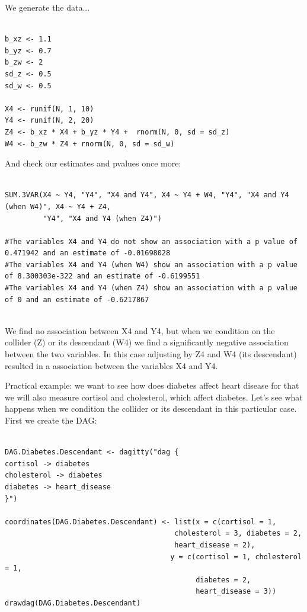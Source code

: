 \documentclass{article}
\begin{document}
We generate the data...


\begin{lstlisting}

b_xz <- 1.1
b_yz <- 0.7
b_zw <- 2
sd_z <- 0.5
sd_w <- 0.5

X4 <- runif(N, 1, 10)
Y4 <- runif(N, 2, 20)
Z4 <- b_xz * X4 + b_yz * Y4 +  rnorm(N, 0, sd = sd_z)
W4 <- b_zw * Z4 + rnorm(N, 0, sd = sd_w)

\end{lstlisting}

And check our estimates and pvalues once more:

\begin{lstlisting}

SUM.3VAR(X4 ~ Y4, "Y4", "X4 and Y4", X4 ~ Y4 + W4, "Y4", "X4 and Y4 (when W4)", X4 ~ Y4 + Z4,
         "Y4", "X4 and Y4 (when Z4)")

#The variables X4 and Y4 do not show an association with a p value of 0.471942 and an estimate of -0.01698028 
#The variables X4 and Y4 (when W4) show an association with a p value of 8.300303e-322 and an estimate of -0.6199551 
#The variables X4 and Y4 (when Z4) show an association with a p value of 0 and an estimate of -0.6217867 


\end{lstlisting}

We find no association between X4 and Y4, but when we condition on the collider (Z) or its descendant (W4) we find a significantly negative association between the two variables. 
In this case adjusting by Z4 and W4 (its descendant) resulted in a association between the variables X4 and Y4. 



Practical example: we want to see how does diabetes affect heart disease for that we will also measure cortisol and cholesterol, which affect diabetes. Let's see what happens when we condition the collider or its descendant in this particular case. First we create the DAG:


\begin{lstlisting}

DAG.Diabetes.Descendant <- dagitty("dag {
cortisol -> diabetes
cholesterol -> diabetes
diabetes -> heart_disease
}")

coordinates(DAG.Diabetes.Descendant) <- list(x = c(cortisol = 1, 
                                        cholesterol = 3, diabetes = 2,
                                        heart_disease = 2),
                                       y = c(cortisol = 1, cholesterol = 1, 
                                             diabetes = 2,  
                                             heart_disease = 3))
drawdag(DAG.Diabetes.Descendant)

\end{lstlisting}
\end{document}
